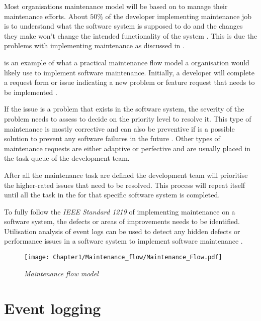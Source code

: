 Most organisations maintenance model will be based on  to manage their maintenance efforts. About $50\%$ of the developer implementing maintenance job is to understand what the software system is supposed to do and the changes they make won't change the intended functionality of the system \cite{Tang2010, Zhuo}. This is due the problems with implementing maintenance as discussed in .\par {} is an example of what a practical maintenance flow model a organisation would likely use to implement software maintenance. Initially, a developer will complete a request form or issue indicating a new problem or feature request that needs to be implemented \cite{Tang2010}.\par If the issue is a problem that exists in the software system, the severity of the problem needs to assess to decide on the priority level to resolve it. This type of maintenance is mostly corrective and can also be preventive if is a possible solution to prevent any software failures in the future \cite{Tang2010}. Other types of maintenance requests are either adaptive or perfective and are usually placed in the task queue of the development team.\par After all the maintenance task are defined the development team will prioritise the higher-rated issues that need to be resolved. This process will repeat itself until all the task in the for that specific software system is completed.\par To fully follow the \textit{IEEE Standard 1219} of implementing maintenance on a software system, the defects or areas of improvements needs to be identified. Utilisation analysis of event logs can be used to detect any hidden defects or performance issues in a software system to implement software maintenance \cite{Cinque2013, Rong2018a, Levin2019}.

\begin{figure}[!htb] %
	\centering %
	\texttt{[image: Chapter1/Maintenance\_flow/Maintenance\_Flow.pdf]}
	\caption[Maintenance flow model]
	{\textit{Maintenance flow model \cite{Tang2010}}} \label{fig:CH1_MaintenanceFlow}
\end{figure}

\clearpage

\section{Event logging}\label{sec:EventLogging}

